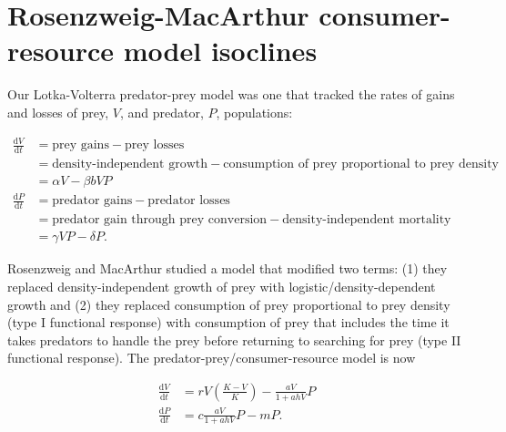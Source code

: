 \documentclass[11pt]{article}
\begin{document}
\section{Rosenzweig-MacArthur consumer-resource model isoclines}

Our Lotka-Volterra predator-prey model was one that tracked the rates of gains and losses of prey, $V$, and predator, $P$, populations:

\begin{equation}
\begin{aligned}
    \frac{\mathrm{d}V}{\mathrm{d}t} &= \text{prey gains} - \text{prey losses} \\
    &= \text{density-independent growth} - \text{consumption of prey proportional to prey density} \\
    &= \alpha V -\beta bVP \\
    \frac{\mathrm{d}P}{\mathrm{d}t} &=  \text{predator gains} - \text{predator losses} \\
    &= \text{predator gain through prey conversion} - \text{density-independent mortality} \\
    &= \gamma VP - \delta P.
\end{aligned}
\end{equation}

Rosenzweig and MacArthur studied a model that modified two terms: (1) they replaced density-independent growth of prey with logistic/density-dependent growth and (2) they replaced consumption of prey proportional to prey density (type I functional response) with consumption of prey that includes the time it takes predators to handle the prey before returning to searching for prey (type II functional response). The predator-prey/consumer-resource model is now

\begin{equation}
\begin{aligned}
    \frac{\mathrm{d}V}{\mathrm{d}t} &= rV\left(\frac{K - V}{K}\right) - \frac{aV}{1 + ahV}P \\
    \frac{\mathrm{d}P}{\mathrm{d}t} &= c\frac{aV}{1 + ahV}P - mP.
\end{aligned}
\end{equation}
\end{document}
